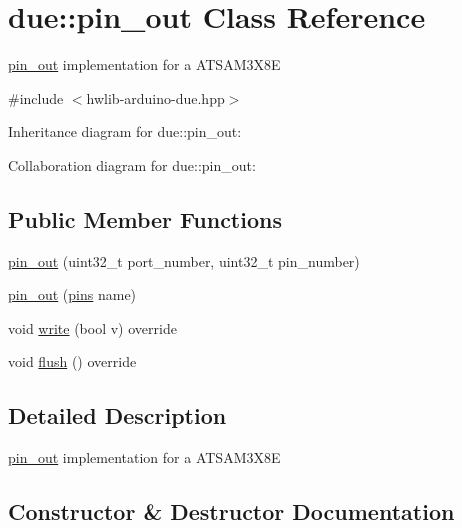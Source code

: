 \hypertarget{classdue_1_1pin__out}{}\section{due\+:\+:pin\+\_\+out Class Reference}
\label{classdue_1_1pin__out}


\hyperlink{classdue_1_1pin__out}{pin\+\_\+out} implementation for a A\+T\+S\+A\+M3\+X8E  




{\ttfamily \#include $<$hwlib-\/arduino-\/due.\+hpp$>$}



Inheritance diagram for due\+:\+:pin\+\_\+out\+:


Collaboration diagram for due\+:\+:pin\+\_\+out\+:
\subsection*{Public Member Functions}
\begin{DoxyCompactItemize}
\item 
\hyperlink{classdue_1_1pin__out_a0b19237d811428c455d607f7ed86da53}{pin\+\_\+out} (uint32\+\_\+t port\+\_\+number, uint32\+\_\+t pin\+\_\+number)
\item 
\hyperlink{classdue_1_1pin__out_ad0ede1c3e5e7501ae0dd045d83578c6c}{pin\+\_\+out} (\hyperlink{namespacedue_a8ffa3ec309934ff9db34317e504bcc92}{pins} name)
\item 
void \hyperlink{classdue_1_1pin__out_aa9127ae6a6d0c5f607569d9f67c5fa2b}{write} (bool v) override
\item 
void \hyperlink{classdue_1_1pin__out_a3db1935f691af312853dc2ebe06a56fb}{flush} () override
\end{DoxyCompactItemize}


\subsection{Detailed Description}
\hyperlink{classdue_1_1pin__out}{pin\+\_\+out} implementation for a A\+T\+S\+A\+M3\+X8E 

\subsection{Constructor \& Destructor Documentation}
\mbox{\label{classdue_1_1pin__out_a0b19237d811428c455d607f7ed86da53}} 
